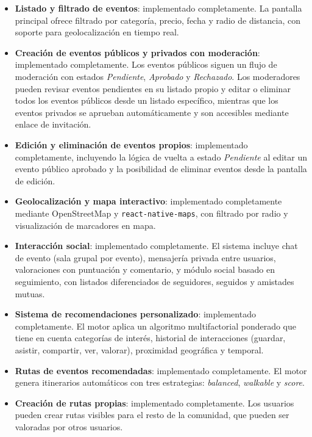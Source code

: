 \begin{itemize}
    \item \textbf{Listado y filtrado de eventos}: implementado completamente. La pantalla principal ofrece filtrado por categoría, precio, fecha y radio de distancia, con soporte para geolocalización en tiempo real.

    \item \textbf{Creación de eventos públicos y privados con moderación}: implementado completamente. Los eventos públicos siguen un flujo de moderación con estados \textit{Pendiente}, \textit{Aprobado} y \textit{Rechazado}. Los moderadores pueden revisar eventos pendientes en su listado propio y editar o eliminar todos los eventos públicos desde un listado específico, mientras que los eventos privados se aprueban automáticamente y son accesibles mediante enlace de invitación.

    \item \textbf{Edición y eliminación de eventos propios}: implementado completamente, incluyendo la lógica de vuelta a estado \textit{Pendiente} al editar un evento público aprobado y la posibilidad de eliminar eventos desde la pantalla de edición.

    \item \textbf{Geolocalización y mapa interactivo}: implementado completamente mediante OpenStreetMap y \texttt{react-native-maps}, con filtrado por radio y visualización de marcadores en mapa.

    \item \textbf{Interacción social}: implementado completamente. El sistema incluye chat de evento (sala grupal por evento), mensajería privada entre usuarios, valoraciones con puntuación y comentario, y módulo social basado en seguimiento, con listados diferenciados de seguidores, seguidos y amistades mutuas.

    \item \textbf{Sistema de recomendaciones personalizado}: implementado completamente. El motor aplica un algoritmo multifactorial ponderado que tiene en cuenta categorías de interés, historial de interacciones (guardar, asistir, compartir, ver, valorar), proximidad geográfica y temporal.

    \item \textbf{Rutas de eventos recomendadas}: implementado completamente. El motor genera itinerarios automáticos con tres estrategias: \textit{balanced}, \textit{walkable} y \textit{score}.

    \item \textbf{Creación de rutas propias}: implementado completamente. Los usuarios pueden crear rutas visibles para el resto de la comunidad, que pueden ser valoradas por otros usuarios.


\end{itemize}

